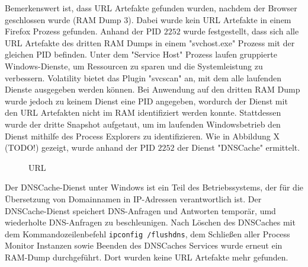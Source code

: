 Bemerkenswert ist, dass URL Artefakte gefunden wurden, nachdem der Browser geschlossen wurde (RAM Dump 3). Dabei wurde kein URL Artefakte in einem Firefox Prozess gefunden.
Anhand der PID $2252$ wurde festgestellt, dass sich alle URL Artefakte des dritten RAM Dumps in einem "svchost.exe" Prozess mit der gleichen PID befinden. Unter dem "Service Host" Prozess laufen gruppierte Windows-Dienste, um Ressourcen zu sparen und die Systemleistung zu verbessern.
Volatility bietet das Plugin "svcscan" an, mit dem alle laufenden Dienste ausgegeben werden können.
Bei Anwendung auf den dritten RAM Dump wurde jedoch zu keinem Dienst eine PID angegeben, wordurch der Dienst mit den URL Artefakten nicht im RAM identifiziert werden konnte. 
Stattdessen wurde der dritte Snapshot aufgetaut, um im laufenden Windowsbetrieb den Dienst mithilfe des Process Explorers zu identifizieren.
Wie in Abbildung X (TODO!) gezeigt, wurde anhand der PID $2252$ der Dienst "DNSCache" ermittelt.
\begin{figure}[h!]
	\centerline{}
	\label{chart:final-criteria}  
	\caption{URL}
\end{figure}
Der DNSCache-Dienst unter Windows ist ein Teil des Betriebssystems, der für die Übersetzung von Domainnamen in IP-Adressen verantwortlich ist. Der DNSCache-Dienst speichert DNS-Anfragen und Antworten temporär, umd wiederholte DNS-Anfragen zu beschleunigen.
Nach Löschen des DNSCaches mit dem Kommandozeilenbefehl \texttt{ipconfig /flushdns}, dem Schließen aller Process Monitor Instanzen sowie Beenden des DNSCaches Services wurde erneut ein RAM-Dump durchgeführt. Dort wurden keine URL Artefakte mehr gefunden.

